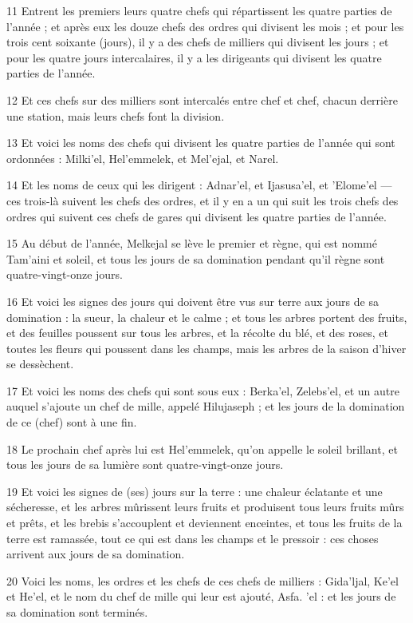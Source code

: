\par 11 Entrent les premiers leurs quatre chefs qui répartissent les quatre parties de l'année ; et après eux les douze chefs des ordres qui divisent les mois ; et pour les trois cent soixante (jours), il y a des chefs de milliers qui divisent les jours ; et pour les quatre jours intercalaires, il y a les dirigeants qui divisent les quatre parties de l'année.
\par 12 Et ces chefs sur des milliers sont intercalés entre chef et chef, chacun derrière une station, mais leurs chefs font la division.
\par 13 Et voici les noms des chefs qui divisent les quatre parties de l'année qui sont ordonnées : Milki'el, Hel'emmelek, et Mel'ejal, et Narel.
\par 14 Et les noms de ceux qui les dirigent : Adnar'el, et Ijasusa'el, et 'Elome'el — ces trois-là suivent les chefs des ordres, et il y en a un qui suit les trois chefs des ordres qui suivent ces chefs de gares qui divisent les quatre parties de l'année.
\par 15 Au début de l'année, Melkejal se lève le premier et règne, qui est nommé Tam'aini et soleil, et tous les jours de sa domination pendant qu'il règne sont quatre-vingt-onze jours.
\par 16 Et voici les signes des jours qui doivent être vus sur terre aux jours de sa domination : la sueur, la chaleur et le calme ; et tous les arbres portent des fruits, et des feuilles poussent sur tous les arbres, et la récolte du blé, et des roses, et toutes les fleurs qui poussent dans les champs, mais les arbres de la saison d'hiver se dessèchent.
\par 17 Et voici les noms des chefs qui sont sous eux : Berka'el, Zelebs'el, et un autre auquel s'ajoute un chef de mille, appelé Hilujaseph ; et les jours de la domination de ce (chef) sont à une fin.
\par 18 Le prochain chef après lui est Hel'emmelek, qu'on appelle le soleil brillant, et tous les jours de sa lumière sont quatre-vingt-onze jours.
\par 19 Et voici les signes de (ses) jours sur la terre : une chaleur éclatante et une sécheresse, et les arbres mûrissent leurs fruits et produisent tous leurs fruits mûrs et prêts, et les brebis s'accouplent et deviennent enceintes, et tous les fruits de la terre est ramassée, tout ce qui est dans les champs et le pressoir : ces choses arrivent aux jours de sa domination.
\par 20 Voici les noms, les ordres et les chefs de ces chefs de milliers : Gida'ljal, Ke'el et He'el, et le nom du chef de mille qui leur est ajouté, Asfa. 'el : et les jours de sa domination sont terminés.

